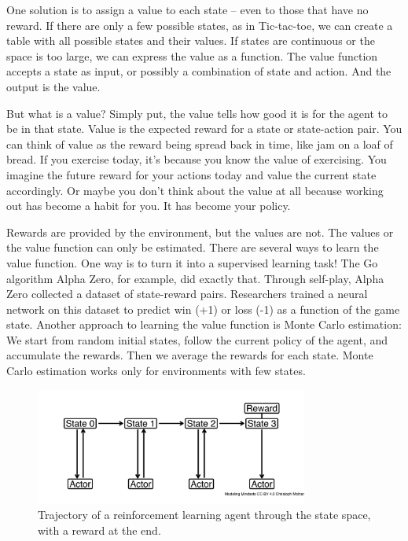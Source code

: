 \documentclass[
  10pt,
]{scrbook}
\begin{document}
One solution is to assign a value to each state -- even to those that have no reward.
If there are only a few possible states, as in Tic-tac-toe, we can create a table with all possible states and their values.
If states are continuous or the space is too large, we can express the value as a function.
The value function accepts a state as input, or possibly a combination of state and action.
And the output is the value.

But what is a value?
Simply put, the value tells how good it is for the agent to be in that state.
Value is the expected reward for a state or state-action pair.
You can think of value as the reward being spread back in time, like jam on a loaf of bread.
If you exercise today, it's because you know the value of exercising.
You imagine the future reward for your actions today and value the current state accordingly.
Or maybe you don't think about the value at all because working out has become a habit for you.
It has become your policy.

Rewards are provided by the environment, but the values are not.
The values or the value function can only be estimated.
There are several ways to learn the value function.
One way is to turn it into a supervised learning task!
The Go algorithm Alpha Zero, for example, did exactly that.
Through self-play, Alpha Zero collected a dataset of state-reward pairs.
Researchers trained a neural network on this dataset to predict win (+1) or loss (-1) as a function of the game state.
Another approach to learning the value function is Monte Carlo estimation:
We start from random initial states, follow the current policy of the agent, and accumulate the rewards.
Then we average the rewards for each state.
Monte Carlo estimation works only for environments with few states.

\begin{figure}

{\centering \includegraphics[width=0.8\textwidth]{figures/rl-trajectory-1} 

}

\caption{Trajectory of a reinforcement learning agent through the state space, with a reward at the end.}\label{fig:rl-trajectory}
\end{figure}
\end{document}

